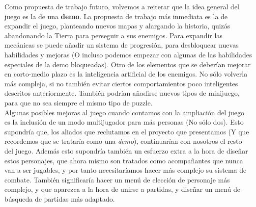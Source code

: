 Como propuesta de trabajo futuro, volvemos a reiterar que la idea general del juego es la de una \textbf{demo}. La propuesta de trabajo más inmediata es la de expandir el juego, planteando nuevos mapas y alargando la historia, quizás abandonando la Tierra para perseguir a sus enemigos. Para expandir las mecánicas se puede añadir un sistema de progresión, para desbloquear nuevas habilidades y mejoras (O incluso podemos empezar con algunas de las habilidades especiales de la demo bloqueadas). Otro de los elementos que se deberían mejorar en corto-medio plazo es la inteligencia artificial de los enemigos. No sólo volverla más compleja, si no también evitar ciertos comportamientos poco inteligentes descritos anteriormente. También podrían añadirse nuevos tipos de minijuego, para que no sea siempre el mismo tipo de puzzle.
\\

Algunas posibles mejoras al juego cuando contamos con la ampliación del juego es la inclusión de un modo multijugador para más personas (No sólo dos). Esto supondría que, los aliados que reclutamos en el proyecto que presentamos (Y que recordemos que se trataría como una \textit{demo}), continuarían con nosotros el resto del juego. Además esto supondría también un esfuerzo extra a la hora de diseñar estos personajes, que ahora mismo son tratados como acompañantes que nunca van a ser jugables, y por tanto necesitaríamos hacer más complejo su sistema de combate. También significaría hacer un menú de elección de personaje más complejo, y que aparezca a la hora de unirse a partidas, y diseñar un menú de búsqueda de partidas más adaptado.